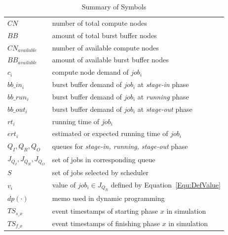 \begin{table}[!htbp] 
        \renewcommand{\arraystretch}{1.3}
        \caption{Summary of Symbols}
        \label{Tab:Symbols}
        \centering
        \begin{tabular}{l|l}
                \hline
                $CN$ & number of total compute nodes \\
                $BB$ & amount of total burst buffer nodes \\
                $CN_{available}$ & number of available compute nodes \\
                $BB_{available}$ & amount of available burst buffer nodes \\
                $c_i$ & compute node demand of $job_i$ \\
                $bb\_in_i$ & burst buffer demand of $job_i$ at \textit{stage-in} phase \\
                $bb\_run_i$ & burst buffer demand of $job_i$ at \textit{running} phase \\
                $bb\_out_i$ & burst buffer demand of $job_i$ at \textit{stage-out} phase \\
                $rt_i$ & running time of $job_i$ \\
                $ert_i$ & estimated or expected running time of $job_i$ \\
                $Q_I, Q_R, Q_O$ & queues for \textit{stage-in, running, stage-out} phase \\
                $J_{Q_I}, J_{Q_R}, J_{Q_O}$ & set of jobs in corresponding queue \\
                $S$ & set of jobs selected by scheduler \\
                $v_i$ & value of $job_i \in J_{Q_R}$ defined by Equation~\ref{Equ:DefValue}\\
                $dp(\cdot)$ & memo used in dynamic programming \\
                $TS_{s\_x}$ & event timestamps of starting phase $x$ in simulation \\
                $TS_{f\_x}$ & event timestamps of finishing phase $x$ in simulation \\
                \hline
        \end{tabular}
\end{table}

